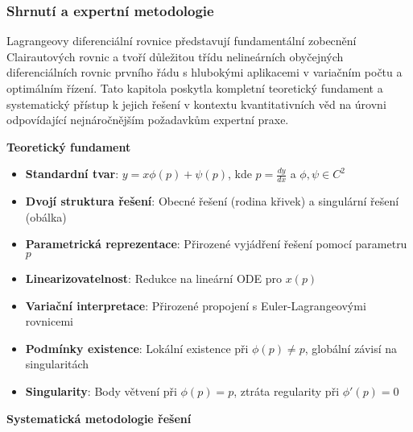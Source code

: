 \subsubsection{Shrnutí a expertní metodologie}
\label{subsec:shrnuti-lagrange}

Lagrangeovy diferenciální rovnice představují fundamentální zobecnění Clairautových rovnic a tvoří důležitou třídu nelineárních obyčejných diferenciálních rovnic prvního řádu s hlubokými aplikacemi v variačním počtu a optimálním řízení. Tato kapitola poskytla kompletní teoretický fundament a systematický přístup k jejich řešení v kontextu kvantitativních věd na úrovni odpovídající nejnáročnějším požadavkům expertní praxe.

\vspace{1\baselineskip}

\noindent\textbf{Teoretický fundament}

\begin{itemize}
\item \textbf{Standardní tvar}: $y = x\phi(p) + \psi(p)$, kde $p = \frac{dy}{dx}$ a $\phi, \psi \in C^2$
\item \textbf{Dvojí struktura řešení}: Obecné řešení (rodina křivek) a singulární řešení (obálka)
\item \textbf{Parametrická reprezentace}: Přirozené vyjádření řešení pomocí parametru $p$
\item \textbf{Linearizovatelnost}: Redukce na lineární ODE pro $x(p)$
\item \textbf{Variační interpretace}: Přirozené propojení s Euler-Lagrangeovými rovnicemi
\item \textbf{Podmínky existence}: Lokální existence při $\phi(p) \neq p$, globální závisí na singularitách
\item \textbf{Singularity}: Body větvení při $\phi(p) = p$, ztráta regularity při $\phi'(p) = 0$
\end{itemize}

\vspace{1\baselineskip}

\noindent\textbf{Systematická metodologie řešení}

